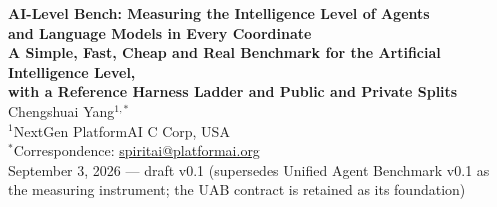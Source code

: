 
\begin{center}
{\LARGE\bfseries AI-Level Bench: Measuring the Intelligence Level of Agents}\\[4pt]
{\LARGE\bfseries and Language Models in Every Coordinate}\\[8pt]
{\large\bfseries A Simple, Fast, Cheap and Real Benchmark for the Artificial Intelligence Level,\\[2pt]
with a Reference Harness Ladder and Public and Private Splits}\\[16pt]
{\large Chengshuai Yang$^{1,*}$}\\[5pt]
{\normalsize $^{1}$NextGen PlatformAI C Corp, USA}\\[4pt]
{\normalsize $^{*}$Correspondence: \href{mailto:spiritai@platformai.org}{spiritai@platformai.org}}\\[10pt]
{\small September 3, 2026 --- draft v0.1 (supersedes Unified Agent Benchmark v0.1 as the measuring instrument; the UAB contract is retained as its foundation)}
\end{center}

